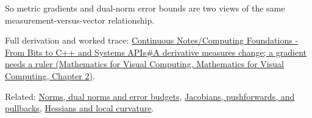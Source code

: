 So metric gradients and dual-norm error bounds are two views of the same measurement-versus-vector relationship.

Full derivation and worked trace: \href{../02-Mathematics-for-Visual-Computing/main.pdf\#nameddest=01-foundations-i-ch018-a-derivative-measures-change-a-gradient-needs-a-ruler}{Continuous Notes/Computing Foundations - From Bits to C++ and Systems APIs\#A derivative measures change; a gradient needs a ruler (Mathematics for Visual Computing, Mathematics for Visual Computing, Chapter 2)}.

Related: \hyperref[appendix-d6d9dbbe3c14]{Norms, dual norms and error budgets}, \hyperref[appendix-d8a7ddb675eb]{Jacobians, pushforwards, and pullbacks}, \hyperref[appendix-6ac071f8b50c]{Hessians and local curvature}.
